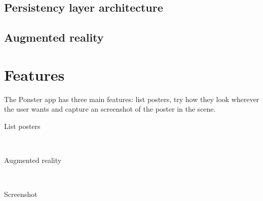 \subsection{Persistency layer architecture}

\subsection{Augmented reality}

\section{Features}
The Ponster app has three main features: list posters, try how they look wherever
the user wants and capture an screenshot of the poster in the scene.

\begin{description}
\item [List posters] \hfill \\
\item [Augmented reality] \hfill \\
\item [Screenshot] \hfill \\
\end{description}
